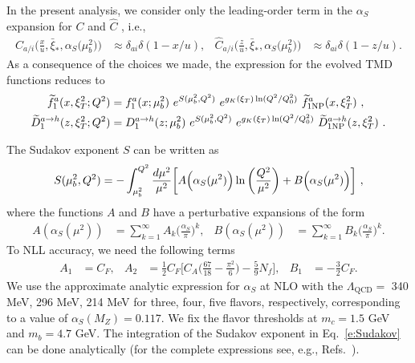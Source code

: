 \documentclass[aps,preprintnumbers,showpacs,nofootinbib,superscriptaddress,floatfix]{revtex4}
\newcommand{\bT}{\xi_T}
\newcommand{\bb}{\xi}
\begin{document}
In the present analysis, we consider only the leading-order term
in the $\alpha_S$ expansion for $C$ and $\hat{C}$ , i.e., 
\begin{align} 
C_{a/i} \Big( \frac{x}{u}, \bar{\bb}_\ast, \alpha_S\big(\mu_b^2\big)  \Big) 
&\approx
\delta_{ai} \delta(1-x/u),
&
\hat{C}_{a/i} \Big( \frac{z}{u}, \bar{\bb}_\ast, \alpha_S\big(\mu_b^2\big) \Big)
 &\approx
\delta_{ai} \delta(1-z/u).
\end{align}  
As a consequence of the choices we made, 
the expression for the evolved TMD functions reduces to
\begin{align}   
\widetilde{f}_1^a (x,  \bT^2; Q^2) &= f_1^a (x ; \mu_b^2) 
\  e^{S (\mu_b^2, Q^2)} \  e^{g_K(\bT) \ln (Q^2 / Q_0^2)} \  \widetilde{f}_{1 {\rm NP}}^a (x, \bT^2) \ ,
\label{e:TMDevol1b} \\
\widetilde{D}_1^{a\to h} (z, \bT^2; Q^2) &= D_1^{a\to h} (z; \mu_b^2) \  e^{S (\mu_b^2, Q^2)} \  e^{g_K( \bT) \ln (Q^2 / Q_0^2)} \  \widetilde{D}_{1 {\rm NP}}^{a\to h} (z, \bT^2) \  .
\label{e:TMDevol2b}
\end{align}

The Sudakov exponent $S$ 
can be written as
\begin{equation} 
S(\mu_b^2,Q^2)=-\int_{\mu_b^2}^{Q^2}{d\mu^2\over \mu^2}
\bigg[A\Big(\alpha_S(\mu^2)\Big)\ln\bigg({Q^2\over \mu^2}\bigg) 
+ B\Big(\alpha_S(\mu^2)\Big) \bigg] \ ,
\label{e:Sudakov} 
\end{equation} 
where the functions $A$ and $B$ have a perturbative expansions of the form
\begin{align}
A\left(\alpha_S(\mu^2)\right) &= \sum_{k=1}^{\infty}A_k
\bigg(\frac{\alpha_S}{\pi} \bigg)^k,
&
B\left(\alpha_S(\mu^2)\right) &= \sum_{k=1}^{\infty}B_k
\bigg(\frac{\alpha_S}{\pi} \bigg)^k.
\end{align} 
To NLL accuracy, we need the following 
terms~\cite{Davies:1984hs,Collins:1984kg}
\begin{align}
A_1&= C_F, 
&
A_2&=
\frac{1}{2} C_F  \bigg[
C_A \bigg( \frac{67}{18} - \frac{\pi^2}{6} \bigg)
- \frac{5}{9} N_f \bigg],
&
B_1&= - \frac{3}{2}C_F.
\end{align} 
We use the approximate analytic expression for $\alpha_S$ at NLO with the
$\Lambda_{\text{QCD}}=$ 340 MeV, 296 MeV, 214 MeV for three, four, five
flavors, respectively, corresponding to a value of $\alpha_S(M_Z)=0.117$. 
We fix the flavor thresholds at $m_c=1.5$ GeV and 
$m_b= 4.7$ GeV. The integration of the Sudakov exponent in
Eq.~\eqref{e:Sudakov} can
be done analytically (for the complete expressions see, e.g.,
Refs.~\cite{Frixione:1998dw,Bozzi:2005wk,Echevarria:2012pw}).  
\end{document}
